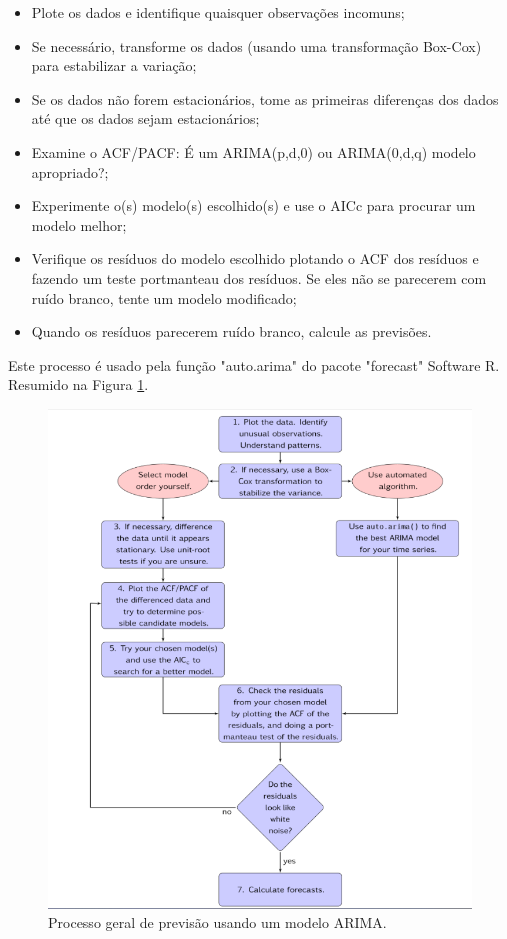 \documentclass[
	12pt,				%
	openright,			%
	oneside,      %
	a4paper,			%
	english,			%
	french,				%
	spanish,			%
	brazil,				%
	]{abntex2}\usepackage[]{graphicx}\usepackage[table]{xcolor}
\theoremstyle{definition}
\theoremstyle{remark}
\begin{document}
\begin{itemize}
  \item Plote os dados e identifique quaisquer observações incomuns;
  \item Se necessário, transforme os dados (usando uma transformação Box-Cox) para estabilizar a variação;
  \item Se os dados não forem estacionários, tome as primeiras diferenças dos dados até que os dados sejam estacionários;
  \item Examine o ACF/PACF: É um ARIMA(p,d,0) ou ARIMA(0,d,q) modelo apropriado?;
  \item Experimente o(s) modelo(s) escolhido(s) e use o AICc para procurar um modelo melhor;
  \item Verifique os resíduos do modelo escolhido plotando o ACF dos resíduos e fazendo um teste portmanteau dos resíduos. Se eles não se parecerem com ruído branco, tente um modelo modificado;
  \item Quando os resíduos parecerem ruído branco, calcule as previsões.
\end{itemize}

Este processo é usado pela função "auto.arima" do pacote "forecast" Software R. Resumido na Figura \ref{img13}.

\begin{figure}
  \caption{\label{img13}Processo geral de previsão usando um modelo ARIMA.}
    \begin{center}
      \includegraphics[width=12cm]{image/img5.png}
    \end{center}
\end{figure}
\end{document}
